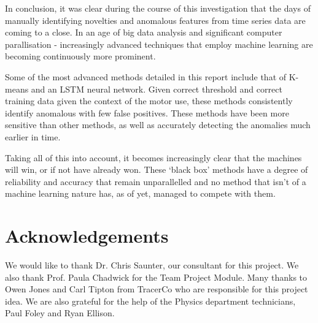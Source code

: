 % 
In conclusion, it was clear during the course of this investigation that the days of manually identifying novelties and anomalous features from time series data are coming to a close. In an age of big data analysis and significant computer parallisation - increasingly advanced techniques that employ machine learning are becoming continuously more prominent. 

Some of the most advanced methods detailed in this report include that of K-means and an LSTM neural network. Given correct threshold and correct training data given the context of the motor use, these methods consistently identify anomalous with few false positives. These methods have been more sensitive than other methods, as well as accurately detecting the anomalies much earlier in time.

Taking all of this into account, it becomes increasingly clear that the machines will win, or if not have already won. These `black box' methods have a degree of reliability and accuracy that remain unparallelled and no method that isn't of a machine learning nature has, as of yet, managed to compete with them.


\section*{Acknowledgements}

\small We would like to thank Dr. Chris Saunter, our consultant for this project. We also thank Prof. Paula Chadwick for the Team Project Module. Many thanks to Owen Jones and Carl Tipton from TracerCo who are responsible for this project idea. We are also grateful for the help of the Physics department technicians, Paul Foley and Ryan Ellison.




















































